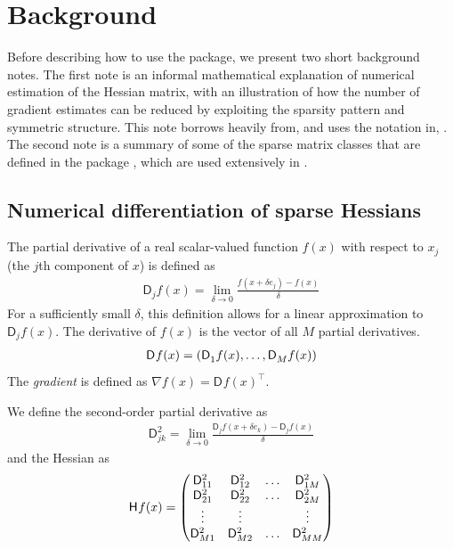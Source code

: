 \documentclass[jss]{jss}\usepackage[]{graphicx}\usepackage[]{color}
\newcommand{\parD}[3]{\mathsf{D}^{#1}_{#2}#3}
\newcommand{\hess}[2]{\mathsf{H}_{#1}#2}
\begin{document}
\section[Background]{Background}\label{sec:background}

Before describing how to use the package, we
present two short background notes.  The first note is an informal
mathematical explanation of numerical estimation of the Hessian
matrix, with an illustration of how the number of gradient estimates
can be reduced by exploiting the sparsity pattern and symmetric
structure.  This note borrows heavily from, and uses the notation in,
\citet[Chapter 6]{MagnusNeudecker2007}. The
second note is a summary of some of the sparse matrix classes that are
defined in the  package \citep{R_Matrix}, which are used
extensively in .

\subsection[Numerical differentiation of sparse Hessians]{Numerical
  differentiation of sparse Hessians}\label{sec:numdiff}

The partial derivative of a real scalar-valued function $f(x)$ with respect to $x_j$ (the $j$th
component of $x$) is defined as
\begin{align}
  \label{eq:defParD}
\parD{}{j}{f(x)}=\lim\limits_{\delta\to 0}\frac{f(x+\delta e_j)-f(x)}{\delta}
\end{align}
For a sufficiently small $\delta$, this definition allows for a
linear approximation to $\parD{}{j}{f(x)}$.  The derivative of $f(x)$
is the vector of all $M$ partial derivatives.
\begin{align}
  \parD{}{}{f(x)}=\left(\parD{}{1}{f(x)},\mathellipsis,\parD{}{M}{f(x)}\right)
  \end{align}
 The \emph{gradient} is defined as $\nabla f(x)=\parD{}{}{f(x)}^\top$.

We define the second-order partial derivative as
\begin{align}
  \label{eq:14}
  \parD{2}{jk}{}=\lim\limits_{\delta\to 0}\frac{\parD{}{j}{f(x+\delta e_k)}-\parD{}{j}{f(x)}}{\delta}
\end{align}
and the Hessian as
\begin{align}
  \label{eq:15}
  \hess{}{f(x)}=
  \begin{pmatrix}
    \parD{2}{11}{}&  \parD{2}{12}{}&  \mathellipsis &  \parD{2}{1M}{}\\
    \parD{2}{21}{}&  \parD{2}{22}{}&  \mathellipsis &  \parD{2}{2M}{}\\
    \vdots&\vdots&&\vdots\\
    \parD{2}{M1}{}&  \parD{2}{M2}{}&  \mathellipsis &  \parD{2}{MM}{}
    \end{pmatrix}
\end{align}
\end{document}
